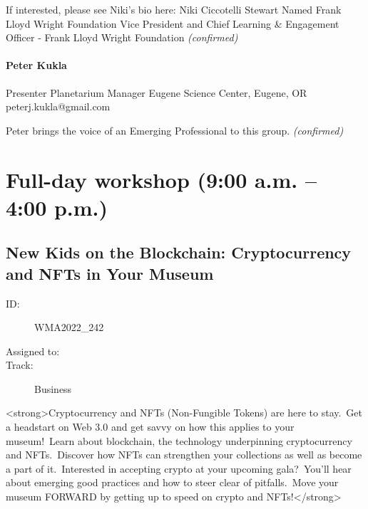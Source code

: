 \documentclass{report}
\begin{document}
                

                If interested, please see Niki's bio here: Niki Ciccotelli Stewart Named Frank Lloyd Wright Foundation Vice President and Chief Learning \& Engagement Officer - Frank Lloyd Wright Foundation
                \emph{ (confirmed) }
              

              
                \subsubsection*{ Peter Kukla }
                Presenter\newline
                Planetarium Manager\newline
                Eugene Science Center, Eugene, OR
                \newline
                peterj.kukla@gmail.com\newline
                
                

                Peter brings the voice of an Emerging Professional to this group.
                \emph{ (confirmed) }
              

              

              
    \newpage
    \chapter*{ Full-day workshop (9:00 a.m. – 4:00 p.m.) }

      
        
        
        
          \newpage
          \section{ New Kids on the Blockchain: Cryptocurrency and NFTs in Your Museum }
            \begin{description}
              \item [ID:]
              WMA2022\_242

              \item [Assigned to:]
                \item [Track:]Business~
              \end{description}

              <strong>Cryptocurrency and NFTs (Non-Fungible Tokens) are here to stay. Get a headstart on Web 3.0 and get savvy on how this applies to your museum! Learn about blockchain, the technology underpinning cryptocurrency and NFTs. Discover how NFTs can strengthen your collections as well as become a part of it. Interested in accepting crypto at your upcoming gala? You’ll hear about emerging good practices and how to steer clear of pitfalls. Move your museum FORWARD by getting up to speed on crypto and NFTs!</strong>
\end{document}
